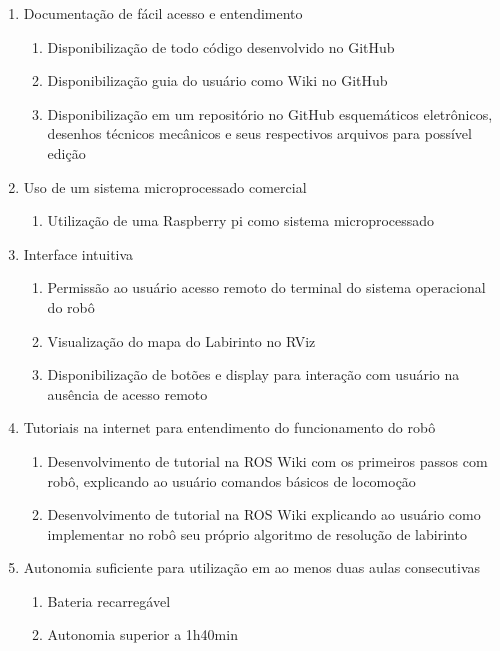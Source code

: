 \begin{enumerate}
	\item Documentação de fácil acesso e entendimento
		\begin{enumerate}
			\item Disponibilização de todo código desenvolvido no GitHub
			\item Disponibilização guia do usuário como Wiki no GitHub
			\item Disponibilização em um repositório no GitHub esquemáticos eletrônicos, desenhos técnicos mecânicos e seus respectivos arquivos para possível edição
		\end{enumerate}
		
	\item Uso de um sistema microprocessado comercial
		\begin{enumerate}
			\item Utilização de uma Raspberry pi como sistema microprocessado
		\end{enumerate}
		
	\item Interface intuitiva
		\begin{enumerate}
			\item Permissão ao usuário acesso remoto do terminal do sistema operacional do robô
			\item Visualização do mapa do Labirinto no RViz
			\item Disponibilização de botões e display para interação com usuário na ausência de acesso remoto
		\end{enumerate}
		
	\item Tutoriais na internet para entendimento do funcionamento do robô
		\begin{enumerate}
			\item Desenvolvimento de tutorial na ROS Wiki com os primeiros passos com robô, explicando ao usuário comandos básicos de locomoção
			\item Desenvolvimento de tutorial na ROS Wiki explicando ao usuário como implementar no robô seu próprio algoritmo de resolução de labirinto
		\end{enumerate}
		
	\item Autonomia suficiente para utilização em ao menos duas aulas consecutivas
		\begin{enumerate}
			\item Bateria recarregável 
			\item Autonomia superior a 1h40min
		\end{enumerate}
		

\end{enumerate}
